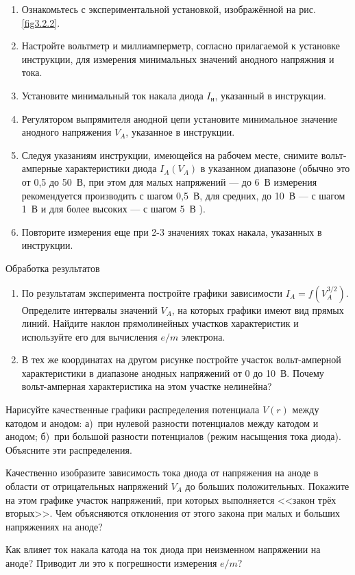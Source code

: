 \begin{enumerate}

\item{ Ознакомьтесь с экспериментальной установкой, изображённой на рис. \ref{fig3.2.2}.}

\item{Настройте вольтметр и миллиамперметр, согласно прилагаемой к установке инструкции, для измерения минимальных значений анодного напряжния и тока.}

\item{ Установите минимальный  ток накала диода $I_{н}$, указанный в инструкции.}

\item{ Регулятором выпрямителя анодной цепи установите минимальное значение анодного напряжения $V_{A}$, указанное в инструкции.}

\item{ Следуя указаниям инструкции, имеющейся на рабочем месте, снимите вольт-амперные характеристики диода $I_{A}(V_{A})$ в указанном диапазоне (обычно это от 0,5 до 50~В, при этом для малых напряжений  --- до 6~В измерения рекомендуется производить с шагом 0,5~В, для средних, до 10~В --- с шагом 1~В и для более высоких --- с шагом 5~В ).}

\item{ Повторите измерения еще при 2-3 значениях токах накала, указанных в инструкции.}
\end{enumerate}

{\rm Обработка результатов}
\begin{enumerate}
\item{ По результатам эксперимента постройте графики зависимости $I_A=f(V_{A}^{3/2})$. Определите интервалы значений $V_{A}$, на которых графики имеют вид прямых линий. Найдите  наклон прямолинейных участков характеристик и используйте его для вычисления $e/m$ электрона.}
\item{ В тех же координатах на другом рисунке постройте участок вольт-амперной характеристики в диапазоне анодных напряжений от 0 до 10~В. Почему вольт-амперная характеристика на этом участке нелинейна?}
\end{enumerate}



\begin{lab:questions}
	\item{ Нарисуйте качественные графики распределения потенциала $V(r)$ между катодом и анодом: а)~при нулевой разности потенциалов между катодом и анодом; б)~при большой разности потенциалов (режим насыщения тока диода). Объясните эти распределения.}
	
	\item{Качественно изобразите зависимость тока диода от напряжения на аноде в области от отрицательных напряжений $V_{A}$ до больших положительных. Покажите на этом графике участок напряжений, при которых выполняется <<закон трёх вторых>>. Чем объясняются отклонения от этого закона при малых и больших напряжениях на аноде?}
	
	\item{ Как влияет ток накала катода на ток диода при неизменном напряжении на аноде? Приводит ли это к погрешности
	измерения $e/m$?}
\end{lab:questions}

